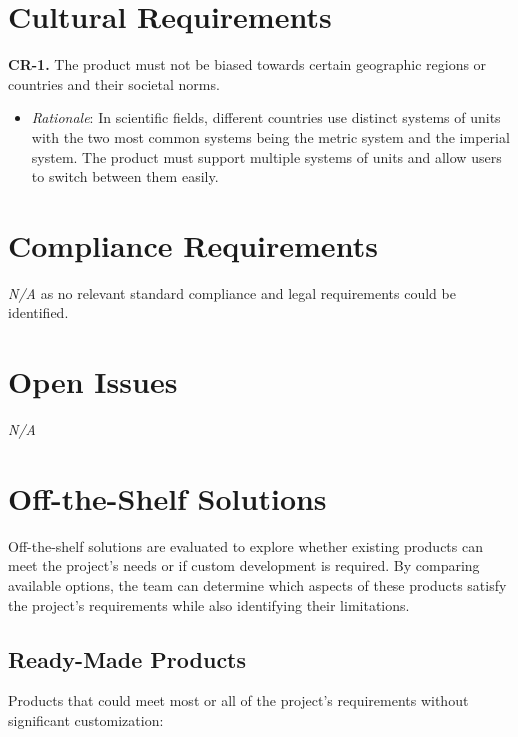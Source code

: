 \documentclass[12pt]{article}
\begin{document}
\section{Cultural Requirements}
\textbf{CR-1.} The product must not be biased towards certain geographic regions or countries and their societal norms.
\begin{itemize}
  \item \emph{Rationale}: In scientific fields, different countries use distinct systems of units with the two most
  common systems being the metric system and the imperial system. The product must support multiple systems of units
  and allow users to switch between them easily.
\end{itemize}

\section{Compliance Requirements}
\emph{N/A} as no relevant standard compliance and legal requirements could be identified.

\section{Open Issues}
\emph{N/A}

\section{Off-the-Shelf Solutions}

Off-the-shelf solutions are evaluated to explore whether existing products can
meet the project’s needs or if custom development is required. By comparing
available options, the team can determine which aspects of these products
satisfy the project's requirements while also identifying their limitations.

\subsection{Ready-Made Products}

Products that could meet most or all of the project’s requirements without
significant customization:
\end{document}
